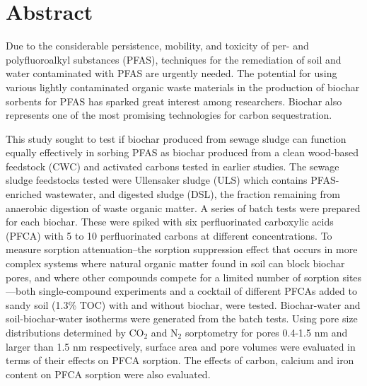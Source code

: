 \newpage
{}
\section*{Abstract}
Due to the considerable persistence, mobility, and toxicity of per- and polyfluoroalkyl substances (PFAS), techniques for the remediation of soil and water contaminated with PFAS are urgently needed. The potential for using various lightly contaminated organic waste materials in the production of biochar sorbents for PFAS has sparked great interest among researchers. Biochar also represents one of the most promising technologies for carbon sequestration.

This study sought to test if biochar produced from sewage sludge can function equally effectively in sorbing PFAS as biochar produced from a clean wood-based feedstock (CWC) and activated carbons tested in earlier studies. The sewage sludge feedstocks tested were Ullensaker sludge (ULS) which contains PFAS-enriched wastewater, and digested sludge (DSL), the fraction remaining from anaerobic digestion of waste organic matter. A series of batch tests were prepared for each biochar. These were spiked with six perfluorinated carboxylic acids (PFCA) with 5 to 10 perfluorinated carbons at different concentrations. To measure sorption attenuation--the sorption suppression effect that occurs in more complex systems where natural organic matter found in soil can block biochar pores, and where other compounds compete for a limited number of sorption sites---both single-compound experiments and a cocktail of different PFCAs added to sandy soil (1.3\% TOC) with and without biochar, were tested. Biochar-water and soil-biochar-water isotherms were generated from the batch tests. Using pore size distributions determined by $\mathrm{CO_2}$ and $\mathrm{N_2}$ sorptometry for pores 0.4-1.5 nm and larger than 1.5 nm respectively, surface area and pore volumes were evaluated in terms of their effects on PFCA sorption. The effects of carbon, calcium and iron content on PFCA sorption were also evaluated.

